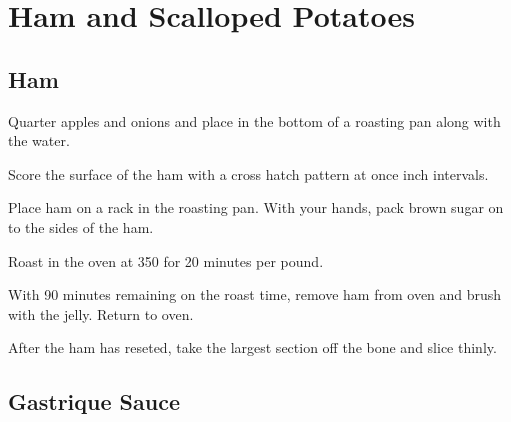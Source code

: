 
\section{Ham and Scalloped Potatoes}
\begin{recipe}


\subsection{Ham}



Quarter apples and onions and place in the bottom of a roasting pan along with the water.

Score the surface of the ham with a cross hatch pattern at once inch intervals.

Place ham on a rack in the roasting pan. With your hands, pack brown sugar on to the sides of the ham.

Roast in the oven at 350\degree{} for 20 minutes per pound.


With 90 minutes remaining on the roast time, remove ham from oven and brush with the jelly. Return to oven.

After the ham has reseted, take the largest section off the bone and slice thinly.

\subsection{Gastrique Sauce}



\end{recipe}
